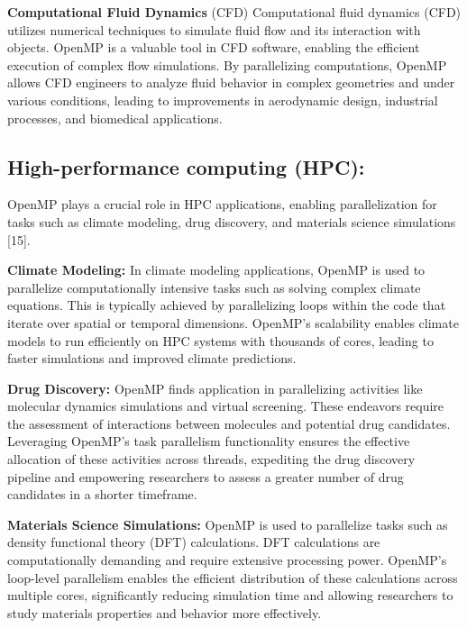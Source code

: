 \documentclass[12pt,conference]{IEEEtran}
\begin{document}
\textbf{Computational Fluid Dynamics} (CFD) Computational fluid dynamics (CFD) utilizes numerical techniques to simulate fluid flow and its interaction with objects. OpenMP is a valuable tool in CFD software, enabling the efficient execution of complex flow simulations. By parallelizing computations, OpenMP allows CFD engineers to analyze fluid behavior in complex geometries and under various conditions, leading to improvements in aerodynamic design, industrial processes, and biomedical applications.


\subsection{High-performance computing (HPC):} OpenMP plays a crucial role in HPC applications, enabling parallelization for tasks such as climate modeling, drug discovery, and materials science simulations [15]. 

\textbf{Climate Modeling:} In climate modeling applications, OpenMP is used to parallelize computationally intensive tasks such as solving complex climate equations. This is typically achieved by parallelizing loops within the code that iterate over spatial or temporal dimensions. OpenMP's scalability enables climate models to run efficiently on HPC systems with thousands of cores, leading to faster simulations and improved climate predictions.

\textbf{Drug Discovery:} OpenMP finds application in parallelizing activities like molecular dynamics simulations and virtual screening. These endeavors require the assessment of interactions between molecules and potential drug candidates. Leveraging OpenMP's task parallelism functionality ensures the effective allocation of these activities across threads, expediting the drug discovery pipeline and empowering researchers to assess a greater number of drug candidates in a shorter timeframe.

\textbf{Materials Science Simulations:} OpenMP is used to parallelize tasks such as density functional theory (DFT) calculations. DFT calculations are computationally demanding and require extensive processing power. OpenMP's loop-level parallelism enables the efficient distribution of these calculations across multiple cores, significantly reducing simulation time and allowing researchers to study materials properties and behavior more effectively.
\end{document}
